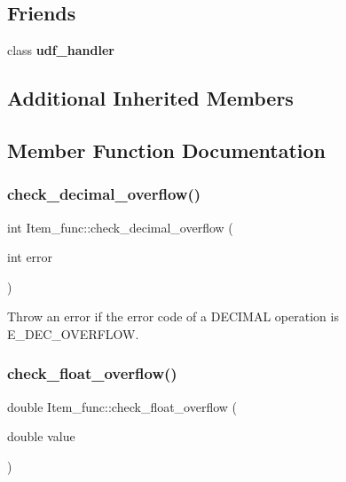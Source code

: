 \subsection*{Friends}
\begin{DoxyCompactItemize}
\item 
\mbox{\label{classItem__func_a96259f7b2d459f19a136d6abdbd2c27d}} 
class {\bfseries udf\+\_\+handler}
\end{DoxyCompactItemize}
\subsection*{Additional Inherited Members}


\subsection{Member Function Documentation}
\mbox{\label{classItem__func_a09947594d7f70394fad68d8d1341c0d0}} 
\subsubsection{\texorpdfstring{check\+\_\+decimal\+\_\+overflow()}{check\_decimal\_overflow()}}
{\footnotesize\ttfamily int Item\+\_\+func\+::check\+\_\+decimal\+\_\+overflow (\begin{DoxyParamCaption}\item[{int}]{error }\end{DoxyParamCaption})\hspace{0.3cm}{\ttfamily [inline]}}

Throw an error if the error code of a D\+E\+C\+I\+M\+AL operation is E\+\_\+\+D\+E\+C\+\_\+\+O\+V\+E\+R\+F\+L\+OW. \mbox{\label{classItem__func_ad5e212313e17d9373e339d59e903f05d}} 
\subsubsection{\texorpdfstring{check\+\_\+float\+\_\+overflow()}{check\_float\_overflow()}}
{\footnotesize\ttfamily double Item\+\_\+func\+::check\+\_\+float\+\_\+overflow (\begin{DoxyParamCaption}\item[{double}]{value }\end{DoxyParamCaption})\hspace{0.3cm}{\ttfamily [inline]}}

